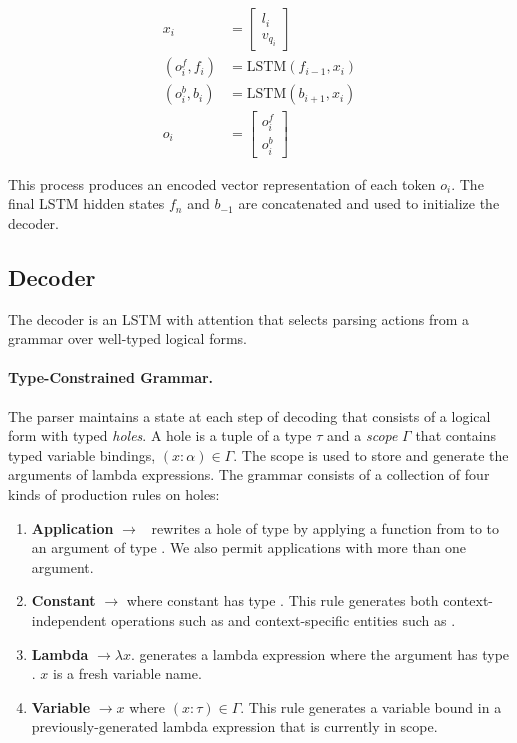 \begin{align}
x_i &= \begin{bmatrix} l_{i} \\ v_{q_i} \end{bmatrix} \\
(o^f_i, f_i) &= \text{LSTM}(f_{i-1}, x_i) \\
(o^b_i, b_i) &= \text{LSTM}(b_{i+1}, x_i) \\
o_i &= \begin{bmatrix} o^f_i \\  o^b_i \end{bmatrix}
\end{align}

This process produces an encoded vector representation of each token $o_i$. The 
final LSTM hidden states $f_n$ and $b_{-1}$ are concatenated  and used to 
initialize the decoder.

\subsection{Decoder}
\label{sec:nnsp_decoder}

The decoder is an LSTM with attention that selects parsing actions from a 
grammar over well-typed logical forms.

\paragraph{Type-Constrained Grammar.} The parser maintains a state at each step 
of decoding that consists of a logical form with typed \emph{holes}.
A hole is a tuple \hole{\tau}{\Gamma} of a type $\tau$ and a \emph{scope} 
$\Gamma$ that contains typed variable bindings, $(x:\alpha) \in \Gamma$.
The scope is used to store and generate the arguments of lambda expressions. 
The grammar consists of a collection of four kinds of production rules on holes:

\begin{enumerate}
    \item \textbf{Application} 
\hole{\tau}{\Gamma}$\rightarrow$\pred{(}\hole{\func{\beta}{\tau}}{\Gamma}~\hole{\beta}{\Gamma}\pred{)}
rewrites a hole of type \type{\tau} by applying a 
function from \type{\beta} to \type{\tau} to an argument of type \type{\beta}. 
We also permit applications with more than one argument.
    \item \textbf{Constant} \hole{\tau}{\Gamma}$\rightarrow$ where 
constant  has type \type{\tau}. This rule generates both 
context-independent operations such as  and context-specific 
entities such as .
    \item \textbf{Lambda} \hole{\func{\alpha}{\tau}}{\Gamma}$\rightarrow 
\lambda x$.  generates a lambda 
expression where the argument has type \type{\alpha}. $x$ is a fresh variable 
name.
    \item \textbf{Variable} \hole{\tau}{\Gamma}$\rightarrow x$ where $(x : 
\tau) \in \Gamma$. This rule generates a variable bound in a 
previously-generated lambda expression that is currently in scope.
\end{enumerate}

